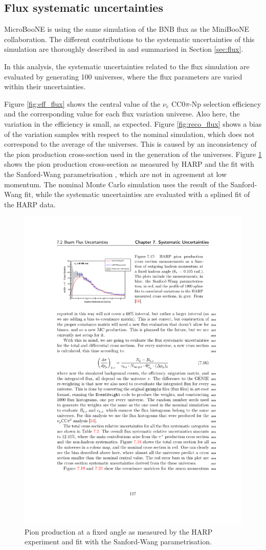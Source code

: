 \subsection{Flux systematic uncertainties}
MicroBooNE is using the same simulation of the BNB flux as the MiniBooNE collaboration. The different contributions to the systematic uncertainties of this simulation are thoroughly described in \cite{AguilarArevalo:2008yp} and summarised in Section \ref{sec:flux}.

In this analysis, the systematic uncertainties related to the flux simulation are evaluated by generating 100 universes, where the flux parameters are varied within their uncertainties. 

Figure \ref{fig:eff_flux} shows the central value of the $\nu_{e}$ CC0$\pi$-Np selection efficiency and the corresponding value for each flux variation universe. Also here, the variation in the efficiency is small, as expected. 
Figure \ref{fig:reco_flux} shows a bias of the variation samples with respect to the nominal simulation, which does not correspond to the average of the universes. This is caused by an inconsistency of the pion production cross-section used in the generation of the universes. 
Figure \ref{fig:harp} shows the pion production cross-section as measured by HARP \cite{Catanesi:2007ab} and the fit with the Sanford-Wang parametrisation \cite{Sanford:1967zza}, which are not in agreement at low momentum. The nominal Monte Carlo simulation uses the result of the Sanford-Wang fit, while the systematic uncertainties are evaluated with a splined fit of the HARP data.

\begin{figure}[htbp]
\centering  
\includegraphics[width=0.75\linewidth]{figures/harp.pdf}
\caption{Pion production at a fixed angle as measured by the HARP experiment and fit with the Sanford-Wang parametrisation.}\label{fig:harp}
\end{figure}

